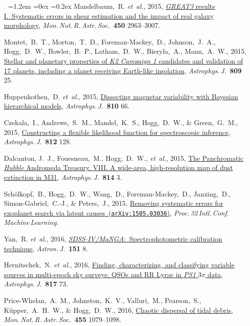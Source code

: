 \documentclass[10pt,letterpaper]{article}
\newcommand{\acronym}[1]{{\small{#1}}}
\newcommand{\foreign}[1]{\textsl{#1}}
\newcommand{\etal}{\foreign{et~al.}}
\newcommand{\project}[1]{\textsl{#1}}
\newcommand{\doi}[2]{\href{http://dx.doi.org/#1}{{#2}}}
\newcommand{\arxiv}[2]{\href{http://arxiv.org/abs/#1}{{#2}\ (\texttt{arXiv:#1})}}
\newcommand{\deemph}[1]{\textcolor{grey}{\footnotesize{#1}}}
\newcommand{\pubnumber}[1]{\deemph{{#1}.}}
\newcounter{refpubnum}
\newcommand{\hogglist}{%
    \rightmargin=0in
    \leftmargin=1.2em
    \topsep=0ex
    \partopsep=0pt
    \itemsep=0.2ex
    \parsep=0pt
    \itemindent=-1.0\leftmargin
    \listparindent=0.0\leftmargin
    \settowidth{\labelsep}{~}
    \usecounter{refpubnum}
  }
\begin{document}
\begin{list}{\pubnumber{\therefpubnum}}{\hogglist}
Mandelbaum,~R. \etal, 2015,
\doi{10.1093/mnras/stv781}{\project{\acronym{GREAT3}} results \acronym{I}.\ Systematic errors in shear
estimation and the impact of real galaxy morphology},
\textit{Mon.\,Not.\,R.\,Astr.\,Soc.}\ \textbf{450} 2963--3007.
\item
Montet,~B.~T., Morton,~T.~D., Foreman-Mackey,~D., Johnson,~J.~A., Hogg,~D.~W.,
Bowler,~B.~P., Latham,~D.~W., Bieryla,~A., Mann,~A.~W., 2015,
\doi{10.1088/0004-637X/809/1/25}{Stellar and planetary properties of
\project{K2 Campaign 1} candidates and validation of 17 planets,
including a planet receiving Earth-like insolation},
\textit{Astrophys.\,J.}\ \textbf{809} 25.
\item
Huppenkothen,~D. \etal, 2015,
\doi{10.1088/0004-637X/810/1/66}{Dissecting magnetar variability with
  Bayesian hierarchical models},
\textit{Astrophys.\,J.}\ \textbf{810} 66.
\item
Czekala,~I., Andrews,~S.~M., Mandel,~K.~S., Hogg,~D.~W., \& Green,~G.~M., 2015,
\doi{10.1088/0004-637X/812/2/128}{Constructing a flexible likelihood
  function for spectroscopic inference},
\textit{Astrophys.\,J.}\ \textbf{812} 128.
\item
Dalcanton, J.~J., Fouesneau,~M., Hogg,~D.~W., \etal, 2015,
\doi{10.1088/0004-637X/814/1/3}{The Panchromatic \project{Hubble} Andromeda Treasury. \acronym{VIII}.
A wide-area, high-resolution map of dust extinction in M31},
\textit{Astrophys.\,J.}\ \textbf{814} 3.
\item
Sch\"olkopf,~B., Hogg,~D.~W., Wang,~D., Foreman-Mackey,~D., Janzing,~D.,
Simon-Gabriel,~C.-J., \& Peters,~J., 2015,
\arxiv{1505.03036}{Removing systematic errors for exoplanet search via latent causes},
\textit{Proc.\,32\,Intl.\,Conf.\,Machine\,Learning}.
\item
Yan,~R. \etal, 2016,
\doi{10.3847/0004-6256/151/1/8}{\project{\acronym{SDSS-IV/MaNGA}}:\ Spectrophotometric calibration technique},
\textit{Astron.\,J.}\ \textbf{151} 8.
\item
Hernitschek,~N. \etal, 2016,
\doi{10.3847/0004-637X/817/1/73}{Finding, characterizing, and classifying variable sources in
multi-epoch sky surveys: QSOs and RR Lyrae in \project{PS1} $3\pi$ data},
\textit{Astrophys.\,J.}\ \textbf{817} 73.
\item
Price-Whelan,~A.~M., Johnston,~K.~V., Valluri,~M., Pearson,~S.,
K\"upper,~A.~H.~W., \& Hogg,~D.~W., 2016,
\doi{10.1093/mnras/stv2383}{Chaotic dispersal of tidal debris},
\textit{Mon.\,Not.\,R.\,Astr.\,Soc.}\ \textbf{455} 1079--1098.
\item

\end{list}
\end{document}
